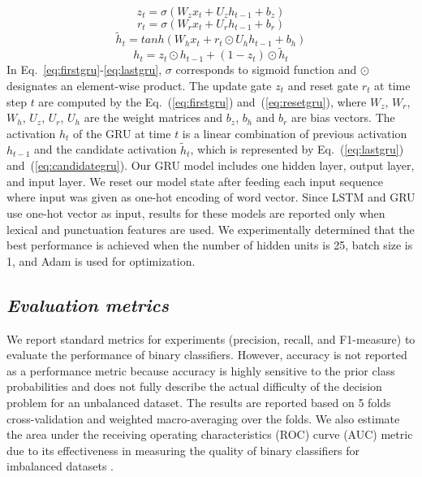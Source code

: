 \documentclass{amia}
\begin{document}
\begin{equation}
z_t = \sigma(W_zx_t + U_zh_{t-1} + b_z)
\label{eq:firstgru}
\end{equation}
\begin{equation}
r_t = \sigma(W_rx_t + U_rh_{t-1} + b_r)
\label{eq:resetgru}
\end{equation}
\begin{equation}
\tilde h_t = tanh(W_hx_t + r_t \odot U_hh_{t-1} + b_h) 
\label{eq:candidategru}
\end{equation}
\begin{equation}
h_t = z_t \odot h_{t-1} + (1-z_t) \odot \tilde h_t
\label{eq:lastgru}
\end{equation}  
In Eq.~\ref{eq:firstgru}-\ref{eq:lastgru}, $\sigma$ corresponds to sigmoid function and $\odot$ designates an element-wise product. The update gate $z_t$ and reset gate $r_t$ at time step $t$ are computed by the Eq.~(\ref{eq:firstgru}) and~(\ref{eq:resetgru}), where $W_z$, $W_r$, $W_h$, $U_z$, $U_r$, $U_h$ are the weight matrices and $b_z$, $b_h$ and $b_r$ are bias vectors. The activation $h_t$ of the GRU at time $t$ is a linear combination of previous activation $h_{t-1}$ and the candidate activation $\tilde h_t$, which is represented by Eq.~(\ref{eq:lastgru}) and~(\ref{eq:candidategru}). Our GRU model includes one hidden layer, output layer, and input layer. We reset our model state after feeding each input sequence where input was given as one-hot encoding of word vector. Since LSTM and GRU use one-hot vector as input, results for these models are reported only when lexical and punctuation features are used. We experimentally determined that the best performance is achieved when the number of hidden units is 25, batch size is 1, and Adam is used for optimization.         
  
\subsection*{\textit{Evaluation metrics}}
We report standard metrics for experiments (precision, recall, and F1-measure) to evaluate the performance of binary classifiers\cite{aas1999text}. However, accuracy is not reported as a performance metric because accuracy is highly sensitive to the prior class probabilities and does not fully describe the actual difficulty of the decision problem for an unbalanced dataset. The results are reported based on 5 folds cross-validation and weighted macro-averaging over the folds. We also estimate the area under the receiving operating characteristics (ROC) curve\cite{kumar2011receiver} (AUC) metric due to its effectiveness in measuring the quality of binary classifiers for imbalanced datasets \cite{hu2015kernelized}. 
\end{document}
